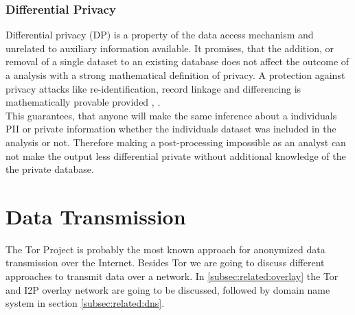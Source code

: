         \subsubsection{Differential Privacy}
            \label{subsec:related:dif_privacy}
            Differential privacy (DP) is a property of the data access mechanism and unrelated to auxiliary information available\cite{dwork_algorithmic_2013}. 
            It promises, that the addition, or removal of a single dataset to an existing database does not affect the outcome of a analysis with a strong mathematical definition of privacy. A protection against privacy attacks like re-identification, record linkage and differencing is mathematically provable provided \cite{agrawal_differential_2008}, \cite{wood_differential_2018}. \\
            This guarantees, that anyone will make the same inference about a individuals PII or private information whether the individuals dataset was included in the analysis or not\cite{wood_differential_2018}. Therefore making a post-processing impossible as an analyst can not make the output less differential private without additional knowledge of the the private database\cite{nguyen_understanding_2019}.
            
\section{Data Transmission}
    \label{sec:related:data_transmission}
    The Tor Project is probably the most known approach for anonymized data transmission over the Internet. Besides Tor we are going to discuss different approaches to transmit data over a network. In \ref{subsec:related:overlay} the Tor and I2P overlay network are going to be discussed, followed by domain name system in section \ref{subsec:related:dns}. 
        
        
